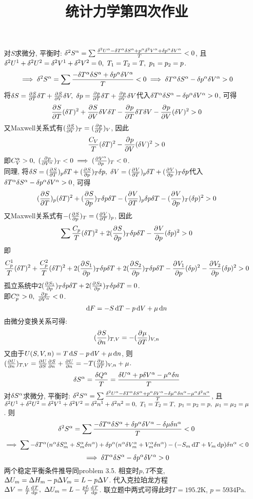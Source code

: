 \documentclass[UTF8,9pt]{ctexart}
\title{统计力学第四次作业}
\begin{document}
 
\maketitle
{}
对$S$求微分, 平衡时: $\de^2S^\a = \sum \f{\de^2U^\a-\de T^\a\de S^\a+p^\a\de^2V^\a+\de p^\a\de V^\a}{T}<0$, 且$\de^2U^1+\de^2U^2=\de^2V^1+\de^2V^2=0,\ T_1=T_2=T,\ p_1=p_2=p$.  
$$\ip \de^2S^\a = \sum \f{-\de T^\a\de S^\a+\de p^\a\de V^\a}{T}<0 \ip \de T^\a\de S^\a-\de p^\a\de V^\a>0$$
\qqed
将$\de S=\pp{S}{T}\de T+\pp{S}{V}\de V,\ \de{p}=\pp{p}{T}\de T+\pp{p}{V}\de V$代入$\de T^\a\de S^\a-\de p^\a\de V^\a>0$, 可得
$$\pp{S}{T}(\de T)^2+\pp{S}{V}\de V\de T-\pp{p}{T}\de T\de V-\pp{p}{V}(\de V)^2>0$$
又Maxwell关系式有$(\pp{S}{V})_T=(\pp{p}{T})_V$, 因此
$$\f{C_V}{T}(\de T)^2-\pp{p}{V}(\de V)^2>0$$
即$C_V^\a>0,\ (\pp{p}{ {V^\alpha} })_T<0 \ip (\pp{ V^\alpha }{p})_T<0$. \\
\qqed
同理, 将$\de S=(\pp{S}{T})_p\de T+(\pp{S}{p})_T\de p,\ \de{V}=(\pp{V}{T})_p\de T+(\pp{V}{p})_T\de p$代入$\de T^\a\de S^\a-\de p^\a\de V^\a>0$, 可得
$$(\pp{S}{T})_p(\de T)^2+(\pp{S}{p})_T\de p\de T-(\pp{V}{T})_p\de p\de T-(\pp{V}{p})_T(\de p)^2>0$$
又Maxwell关系式有$-(\pp{S}{p})_T=(\pp{V}{T})_p$, 因此
$$\sum \f{C_p}{T}(\de T)^2+2(\pp{S}{p})_T\de p\de T-\pp{V}{p}(\de p)^2>0$$
即
$$\f{C^1_p}{T}(\de T)^2+\f{C^2_p}{T}(\de T)^2+2(\pp{S_1}{p})_T\de p\de T+2(\pp{S_2}{p})_T\de p\de T-\pp{V_1}{p}(\de p)^2-\pp{V_2}{p}(\de p)^2>0$$
孤立系统中$2(\pp{S_1}{p})_T\de p\de T+2(\pp{S_2}{p})_T\de p\de T=0$.\\
即$C_p^\a>0,\ \pp{p}{{V^\a}}<0$. \\
\qqed
{}
$$\d F = -S\d T-p\d V+\mu \d n$$
由微分变换关系可得:
$$(\pp{S}{n})_{T,V}=-(\pp{\mu}{T})_{V,n}$$
又由于$U(S,V,n)=T\d S-p\d V+\mu\d n$, 则$(\pp{U}{n})_{T,V} = \pp{U}{S}\pp{S}{n}+\pp{U}{n} = -T(\pp{\mu}{T})_{V,n}+\mu$.
$$\de S^\a=\f{\de Q^\a}{T} = \f{\de U^\a + p\de V^\a- \mu^\a \de n}{T}$$
对$\de S^\a$求微分, 平衡时: $\de^2S^\a = \sum \f{\de^2U^\a-\de T^\a\de S^\a+p^\a\de V^\a-\de\mu^\a\de n^\a-\mu^\a\de^2 n^\a}{T}$, 且$\de^2U^1+\de^2U^2=\de^2V^1+\de^2V^2=\de^2n^1+\de^2n^2=0,\ T_1=T_2=T,\ p_1=p_2=p,\ \mu_1=\mu_2=\mu$.  则
$$\de^2S^\a = \sum \f{-\de T^\a\de S^\a+\de p^\a\de V^\a-\de\mu\de n^\a}{T}<0$$
$$\ip \sum -\de T^\a(n^\a\de S_m^\a+S_m^\a\de n^\a)+\de p^\a(n^\a\de V_m^\a+V_m^\a\de n^\a)-(-S_m\d T+V_m\d p)\de n^\a<0$$
$$\ip \de T^\a\de S^\a-\de p^\a\de V^\a>0$$
两个稳定平衡条件推导同problem 3.5. 
相变时$p, T$不变, $\D U_m=\D H_m-p\D V_m=L-p\D V$. 代入克拉珀龙方程$\D V=\f{L}{T}\dd{T}{p},\ \D U_m=L-\f{pL}{T}\dd{T}{p}$.
联立题中两式可得此时$T=195.2$K, $p=5934$Pa.\\
\end{document}
